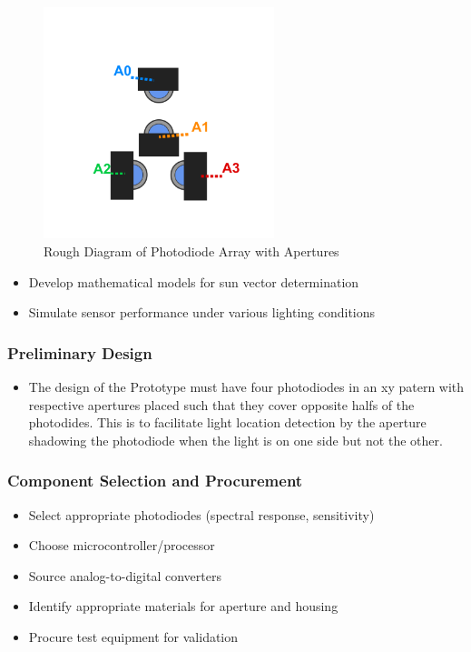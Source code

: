 %
\begin{figure}[htbp] %
    \centering
    \includegraphics[width=0.6\textwidth]{chapters/methodology/prototype/diodeApertureDiagram.png}
    \caption{Rough Diagram of Photodiode Array with Apertures}
    \label{fig:diodeApertureDiagram}
\end{figure}


\begin{itemize}
  \item Develop mathematical models for sun vector determination
  \item Simulate sensor performance under various lighting conditions
\end{itemize}

\subsubsection*{Preliminary Design}
\begin{itemize}
  \item The design of the Prototype must have four photodiodes in an xy patern with respective apertures placed such that they cover opposite halfs of the photodides. This is to facilitate light location detection by the aperture shadowing the photodiode when the light is on one side but not the other.
\end{itemize}

\subsubsection*{Component Selection and Procurement}
\begin{itemize}
  \item Select appropriate photodiodes (spectral response, sensitivity)
  \item Choose microcontroller/processor
  \item Source analog-to-digital converters
  \item Identify appropriate materials for aperture and housing
  \item Procure test equipment for validation
\end{itemize}

